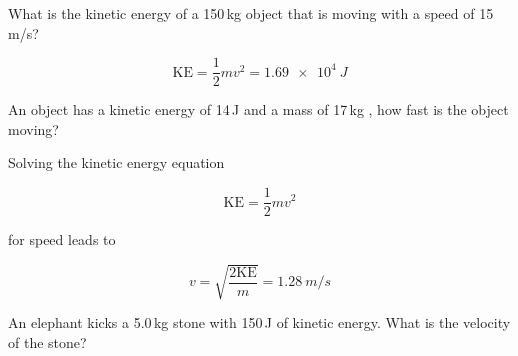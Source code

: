 \documentclass[answers]{exam}
\begin{document}
\begin{questions}







\question %
What is the kinetic energy of a 150\,kg object that is moving with a speed of 15\,m/s? 

\begin{solution}
\phantom{.}

\begin{equation*}
    \mathrm{KE} = \frac{1}{2}mv^2 = \boxed{\SI{1.69e4}{J}}
\end{equation*}
\end{solution}

\question %
An object has a kinetic energy of 14\,J and a mass of 17\,kg , how fast is the object moving? 

\begin{solution}
Solving the kinetic energy equation

\begin{equation*}
    \mathrm{KE} = \frac{1}{2} mv^2
\end{equation*}

for speed leads to

\begin{equation*}
    v = \sqrt{\frac{2\mathrm{KE}}{m}} = \boxed{\SI{1.28}{m/s}}
\end{equation*}
\end{solution}

\question %
An elephant kicks a 5.0\,kg stone with 150\,J of kinetic energy. What is the velocity of the stone? 


\end{questions}
\end{document}
